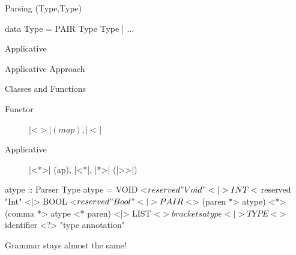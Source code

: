 \documentclass{beamer}
\newenvironment{twocolumns}[1][0.45]{
  \begin{columns}
    \begin{column}{#1\textwidth}
      \newcommand{\nextcolumn}[1][]{
      \end{column}
      \begin{column}[##1]{\textwidth-#1\textwidth-0.1\textwidth}
      }
    }{
    \end{column}
  \end{columns}
}
\begin{document}
\begin{frame}[fragile]{Parsing (Type,Type)}
    \begin{HASKELL}
      data Type = PAIR Type Type | ...
    \end{HASKELL}


  \pause
  \begin{block}{Applicative}
  \end{block}

\end{frame}

\begin{frame}[fragile]{Applicative Approach}

  \begin{block}{Classes and Functions}
    \begin{description}
      \item[Functor]     |<$>| (map), |<$|
      \item[Applicative] |<*>| (ap), |<*|, |*>| (|>>|)
    \end{description}
  \end{block}

  \pause
    \begin{HASKELL}
      atype :: Parser Type
      atype =   VOID <$  reserved "Void"
            <|> INT  <$  reserved "Int"
            <|> BOOL <$  reserved "Bool"
            <|> PAIR <$> (paren *> atype)
                     <*> (comma *> atype <* paren)
            <|> LIST <$> brackets atype
            <|> TYPE <$> identifier
            <?> "type annotation"
    \end{HASKELL}

  \pause

  Grammar stays almost the same!

\end{frame}
\end{document}
